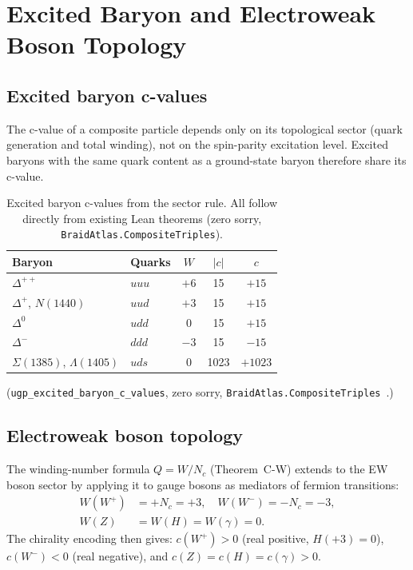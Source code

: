 \documentclass[11pt]{article}
\theoremstyle{remark}
\begin{document}
\section{Excited Baryon and Electroweak Boson Topology}
\label{sec:ew_excited}

\subsection{Excited baryon c-values}
\label{subsec:excited_baryons}

The c-value of a composite particle depends only on its topological sector
(quark generation and total winding), not on the spin-parity excitation level.
Excited baryons with the same quark content as a ground-state baryon therefore
share its c-value.

\begin{table}[H]
\centering
\caption{Excited baryon c-values from the sector rule.
  All follow directly from existing Lean theorems (zero sorry,
  \texttt{BraidAtlas.CompositeTriples}).}
\label{tab:excited_baryons}
\small
\begin{tabular}{llccc}
\toprule
Baryon & Quarks & $W$ & $|c|$ & $c$ \\
\midrule
$\Delta^{++}$ & $uuu$ & $+6$ & 15 & $+15$ \\
$\Delta^+$, $N(1440)$ & $uud$ & $+3$ & 15 & $+15$ \\
$\Delta^0$ & $udd$ & $0$ & 15 & $+15$ \\
$\Delta^-$ & $ddd$ & $-3$ & 15 & $-15$ \\
$\Sigma(1385)$, $\Lambda(1405)$ & $uds$ & $0$ & 1023 & $+1023$ \\
\bottomrule
\end{tabular}
\end{table}

(\texttt{\scriptsize ugp\_excited\_baryon\_c\_values}, zero sorry, \texttt{\scriptsize BraidAtlas\allowbreak.CompositeTriples}~\cite{SpivackUGPFormalization,ugp-lean}.)

\subsection{Electroweak boson topology}
\label{subsec:ew_bosons}

The winding-number formula $Q = W/N_c$ (Theorem~C-W) extends to the EW boson sector
by applying it to gauge bosons as mediators of fermion transitions:
\begin{align*}
  W(W^+) &= +N_c = +3, \quad W(W^-) = -N_c = -3, \\
  W(Z) &= W(H) = W(\gamma) = 0.
\end{align*}
The chirality encoding then gives:
$c(W^+) > 0$ (real positive, $H(+3) = 0$),
$c(W^-) < 0$ (real negative),
and $c(Z) = c(H) = c(\gamma) > 0$.
\end{document}
